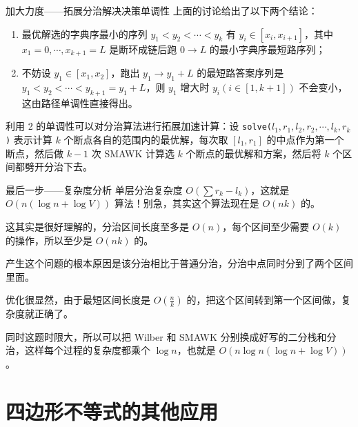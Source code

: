 \documentclass{beamer}
\begin{document}
\begin{frame}{加大力度——拓展分治解决决策单调性}
	上面的讨论给出了以下两个结论：
	\begin{enumerate}
		\item 最优解选的字典序最小的序列 $y_1 < y_2 < \cdots<y_k$ 有 $y_i \in [x_i,x_{i+1}]$，其中 $x_1=0,\cdots,x_{k+1}=L$ 是断环成链后跑 $0 \rightarrow L$ 的最小字典序最短路序列；
		\item 不妨设 $y_1 \in [x_1,x_2]$，跑出 $y_1 \rightarrow y_1+L$ 的最短路答案序列是 $y_1<y_2<\cdots<y_{k+1}=y_1+L$，则 $y_1$ 增大时 $y_i(i \in [1,k+1])$ 不会变小，这由路径单调性直接得出。
	\end{enumerate}
	利用 2 的单调性可以对分治算法进行拓展加速计算：设 \texttt{solve($l_1,r_1,l_2,r_2,\cdots,l_k,r_k$)} 表示计算 $k$ 个断点各自的范围内的最优解，每次取 $[l_1,r_1]$ 的中点作为第一个断点，然后做 $k-1$ 次 SMAWK 计算选 $k$ 个断点的最优解和方案，然后将 $k$ 个区间都劈开分治下去。
\end{frame}
\begin{frame}{最后一步——复杂度分析}
	单层分治复杂度 $O(\sum r_k-l_k)$，这就是 $O(n(\log n + \log V))$ 算法！别急，其实这个算法现在是 $O(nk)$ 的。\pause
	
	这其实是很好理解的，分治区间长度至多是 $O(n)$，每个区间至少需要 $O(k)$ 的操作，所以至少是 $O(nk)$ 的。
	
	产生这个问题的根本原因是该分治相比于普通分治，分治中点同时分到了两个区间里面。\pause
	
	优化很显然，由于最短区间长度是 $O(\frac{n}{k})$ 的，把这个区间转到第一个区间做，复杂度就正确了。
	
	同时这题时限大，所以可以把 Wilber 和 SMAWK 分别换成好写的二分栈和分治，这样每个过程的复杂度都乘个 $\log n$，也就是 $O(n \log n(\log n + \log V))$。
\end{frame}
\section{四边形不等式的其他应用}
\end{document}
